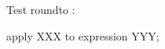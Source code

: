 \begin{schema}{Test}
   roundto : \nat
\end{schema}

\begin{zproof}[Test]
   apply XXX to expression YYY;
\end{zproof}